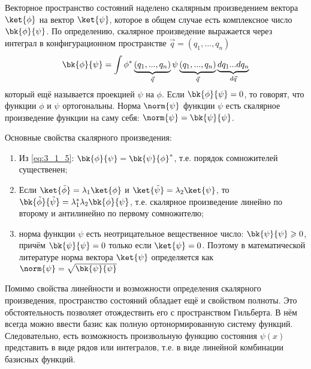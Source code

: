 Векторное пространство состояний наделено скалярным произведением вектора $\ket{\phi}$ на вектор $\ket{\psi}$, которое в общем случае есть комплексное число $\bk{\phi}{\psi}$. По определению, скалярное произведение выражается через интеграл в конфигурационном пространстве $\vec{q} = (q_1, ..., q_n)$%
%
\begin{equation}
\label{eq:3_1_5}
\bk{\phi}{\psi} = \int \phi^*\underbrace{(q_1, ..., q_n)}_{\vec{q}} \psi\underbrace{(q_1, ..., q_n)}_{\vec{q}} \underbrace{d q_1 ... d q_n}_{d\vec{q}}
\end{equation}%
%
который ещё называется проекцией $\psi$ на $\phi$. Если $\bk{\phi}{\psi} = 0$, то говорят, что функции $\phi$ и $\psi$ ортогональны. Норма $\norm{\psi}$ функции $\psi$ есть скалярное произведение функции на саму себя: $\norm{\psi} = \bk{\psi}{\psi}$.

Основные свойства скалярного произведения:%
%
\begin{enumerate}
  \item Из \eqref{eq:3_1_5}: $\bk{\phi}{\psi} = \bk{\psi}{\phi}^*$, т.е. порядок сомножителей существенен;
%
  \item Если $\ket{\tilde{\phi}} = \lambda_1\ket{\phi}$ и $\ket{\tilde{\psi}} = \lambda_2\ket{\psi}$, то $\bk{\tilde{\phi}}{\tilde{\psi}} = \lambda_1^* \lambda_2 \bk{\phi}{\psi}$, т.е. скалярное произведение линейно по второму и антилинейно по первому сомножителю;
%
  \item норма функции $\psi$ есть неотрицательное вещественное число: $\bk{\psi}{\psi} \geqslant 0$, причём $\bk{\psi}{\psi} = 0$ только если $\ket{\psi} = 0$. Поэтому в математической литературе норма вектора $\ket{\psi}$ определяется как $\norm{\psi} = \sqrt{\bk{\psi}{\psi}}$
\end{enumerate}

Помимо свойства линейности и возможности определения скалярного произведения, пространство состояний обладает ещё и свойством полноты. Это обстоятельность позволяет отождествить его с пространством Гильберта\footnotemark. В нём всегда можно ввести базис как полную ортонормированную систему функций. Следовательно, есть возможность произвольную функцию состояния $\psi(x)$ представить в виде рядов или интегралов, т.е. в виде линейной комбинации базисных функций.

